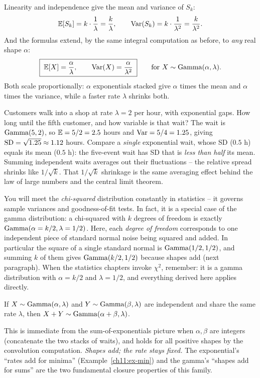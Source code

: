 Linearity and independence give the mean and variance of $S_k$:
\[
  \operatorname{\mathbb{E}}[S_k] = k\cdot\frac{1}{\lambda} = \frac{k}{\lambda},
  \qquad
  \operatorname{Var}(S_k) = k\cdot\frac{1}{\lambda^2} = \frac{k}{\lambda^2}.
\]
And the formulas extend, by the same integral computation as before, to
\emph{any} real shape $\alpha$:
\[
  \boxed{\;\operatorname{\mathbb{E}}[X] = \frac{\alpha}{\lambda}, \qquad
         \operatorname{Var}(X) = \frac{\alpha}{\lambda^2}\;}
  \qquad \text{for } X\sim\operatorname{Gamma}(\alpha,\lambda).
\]
Both scale proportionally: $\alpha$ exponentials stacked give $\alpha$ times the
mean and $\alpha$ times the variance, while a faster rate $\lambda$ shrinks both.
\begin{example}
\label{ch11:ex-fifth}
Customers walk into a shop at rate $\lambda = 2$ per hour, with exponential gaps.
How long until the fifth customer, and how variable is that wait? The wait is
$\operatorname{Gamma}(5,2)$, so $\operatorname{\mathbb{E}} = 5/2 = 2.5$ hours and $\operatorname{Var} = 5/4 = 1.25$, giving
$\operatorname{SD} = \sqrt{1.25}\approx 1.12$ hours. Compare a \emph{single} exponential wait,
whose SD ($0.5$ h) equals its mean ($0.5$ h): the five-event wait has SD that is
\emph{less than half} its mean. Summing independent waits averages out their
fluctuations -- the relative spread shrinks like $1/\sqrt{k}$. That $1/\sqrt{k}$
shrinkage is the same averaging effect behind the law of large numbers and the
central limit theorem.
\end{example}
\begin{connectionbox}
You will meet the \emph{chi-squared} distribution constantly in statistics --
it governs sample variances and goodness-of-fit tests. In fact, it is a special
case of the gamma distribution:
a chi-squared with $k$ degrees of freedom is exactly $\operatorname{Gamma}(\alpha=k/2,
\lambda=1/2)$. Here, each \emph{degree of freedom} corresponds to one independent
piece of standard normal noise being squared and added. In particular the square
of a single standard normal is $\operatorname{Gamma}(1/2,1/2)$, and summing $k$ of them gives
$\operatorname{Gamma}(k/2,1/2)$ because shapes add (next paragraph). When the statistics
chapters invoke $\chi^2$, remember: it is a gamma distribution with $\alpha=k/2$
and $\lambda=1/2$, and everything derived here applies directly.
\end{connectionbox}
\begin{proposition}
\label{ch11:prop-gamma-add}
If $X\sim\operatorname{Gamma}(\alpha,\lambda)$ and $Y\sim\operatorname{Gamma}(\beta,\lambda)$ are independent
and share the same rate $\lambda$, then $X+Y\sim\operatorname{Gamma}(\alpha+\beta,\lambda)$.
\end{proposition}
This is immediate from the sum-of-exponentials picture when $\alpha,\beta$ are
integers (concatenate the two stacks of waits), and holds for all positive
shapes by the convolution computation. \emph{Shapes add; the rate stays fixed.}
The exponential's ``rates add for minima'' (Example~\ref{ch11:ex-min}) and the
gamma's ``shapes add for sums'' are the two fundamental closure properties of
this family.

